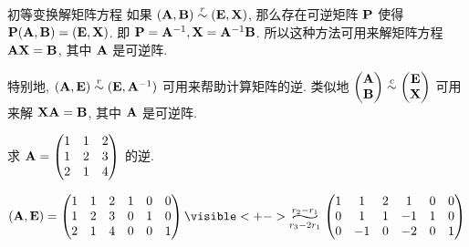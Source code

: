 \begin{frame}{初等变换解矩阵方程}
	\onslide<+->
	如果 $({\mathbf{A}},{\mathbf{B}})\mathrel{\overset{r}{\sim}} ({\mathbf{E}},{\mathbf{X}})$, 那么存在可逆矩阵 ${\mathbf{P}}$ 使得 ${\mathbf{P}}({\mathbf{A}},{\mathbf{B}})=({\mathbf{E}},{\mathbf{X}})$.
	\onslide<+->
	即 ${\mathbf{P}}={\mathbf{A}}^{-1},{\mathbf{X}}={\mathbf{A}}^{-1}{\mathbf{B}}$.
	\onslide<+->
	所以这种方法可用来解矩阵方程 ${\mathbf{A}}{\mathbf{X}}={\mathbf{B}}$, 其中 ${\mathbf{A}}$ 是可逆阵.

	\onslide<+->
	特别地, \alert{$({\mathbf{A}},{\mathbf{E}})\mathrel{\overset{r}{\sim}}({\mathbf{E}},{\mathbf{A}}^{-1})$} 可用来帮助计算矩阵的逆.
	\onslide<+->
	类似地 $\begin{pmatrix}
		{\mathbf{A}}\\
		{\mathbf{B}}
	\end{pmatrix}\mathrel{\overset{c}{\sim}}\begin{pmatrix}
		{\mathbf{E}}\\
		{\mathbf{X}}
	\end{pmatrix}$ 可用来解 ${\mathbf{X}}{\mathbf{A}}={\mathbf{B}}$, 其中 ${\mathbf{A}}$ 是可逆阵.

	\onslide<+->
	\begin{exercise}
		求 ${\mathbf{A}}=\begin{pmatrix}
			1&1&2\\1&2&3\\2&1&4
		\end{pmatrix}$ 的逆.
	\end{exercise}
	\onslide<+->
	\begin{solution}
		\[(\bfA,\bfE)=\begin{pmatrix}
			1&1&2&1&0&0\\
			1&2&3&0&1&0\\
			2&1&4&0&0&1
		\end{pmatrix}
		\visible<+->{\wsim[3]{r_2-r_1}{r_3-2r_1}\begin{pmatrix}
			1&1&2&1&0&0\\
			0&1&1&-1&1&0\\
			0&-1&0&-2&0&1
		\end{pmatrix}}\]
		\vspace{-.7\baselineskip}
	\end{solution}
\end{frame}



